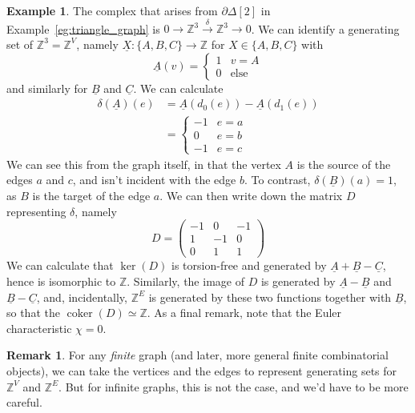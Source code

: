 \documentclass{tufte-handout}
\def\ZZ{\mathbb{Z}}
\DeclareMathOperator{\coker}{coker}
\theoremstyle{definition}
\newtheorem{example}{Example}
\newtheorem*{rem}{Remark}
\begin{document}
\begin{example}
The complex that arises from $\partial\Delta[2]$ in Example~\ref{eg:triangle_graph} is 
$0\to\ZZ^3\xrightarrow{\delta} \ZZ^3 \to 0$. We can identify a generating set of 
$\ZZ^3 = \ZZ^V$, namely $\underline{X}\colon\{A,B,C\}\to \ZZ$ for $X\in \{A,B,C\}$ with
\[
	\underline{A}(v) = \begin{cases}
				1 & v=A\\
				0 & \text{else}
	\end{cases}
\]
and similarly for $\underline{B}$ and $\underline{C}$. We can calculate
\begin{align*}
	\delta(\underline{A})(e) & = \underline{A}(d_0(e)) - \underline{A}(d_1(e))\\
							& =\begin{cases}
							-1 & e=a\\
							0 & e=b\\
							-1& e=c
							\end{cases}
\end{align*}
We can see this from the graph itself, in that the vertex $A$ is the source of the edges $a$ and $c$, and isn't incident with the edge $b$. To contrast, $\delta(\underline{B})(a) = 1$, as $B$ is the target of the edge $a$. We can then write down the matrix $D$ representing $\delta$, namely
\[
	D = \begin{pmatrix}
		-1 & 0 & -1\\
		1 & -1 & 0\\
		0 & 1 & 1
	\end{pmatrix}
\]
We can calculate that $\ker(D)$ is torsion-free and generated by $\underline{A} + \underline{B} - \underline{C}$, hence is isomorphic to $\mathbb{Z}$. Similarly, the image of $D$ is generated by $\underline{A} - \underline{B}$ and $\underline{B} - \underline{C}$, and, incidentally, $\ZZ^E$ is generated by these two functions together with $\underline{B}$, so that the $\coker(D) \simeq \ZZ$. As a final remark, note that the Euler characteristic $\chi=0$.
\end{example}

\begin{rem}\label{remark:finite_complexes_basis}
For any \emph{finite} graph (and later, more general finite combinatorial objects), we can take the vertices and the edges to represent generating sets for $\ZZ^V$ and $\ZZ^E$. But for infinite graphs, this is not the case, and we'd have to be more careful.
\end{rem}
\end{document}
